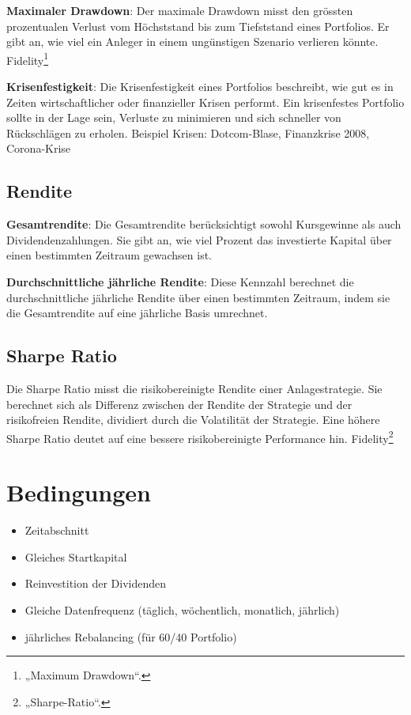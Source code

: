 \documentclass[
  ngerman,
  a4paper,
  DIV=11,
  oneside]{scrreprt}
\providecommand{\tightlist}{%
  \setlength{\itemsep}{0pt}\setlength{\parskip}{0pt}}
\begin{document}
\textbf{Maximaler Drawdown}: Der maximale Drawdown misst den grössten
prozentualen Verlust vom Höchststand bis zum Tiefststand eines
Portfolios. Er gibt an, wie viel ein Anleger in einem ungünstigen
Szenario verlieren könnte. Fidelity\footnote{{„Maximum {Drawdown}``}.}

\textbf{Krisenfestigkeit}: Die Krisenfestigkeit eines Portfolios
beschreibt, wie gut es in Zeiten wirtschaftlicher oder finanzieller
Krisen performt. Ein krisenfestes Portfolio sollte in der Lage sein,
Verluste zu minimieren und sich schneller von Rückschlägen zu erholen.
Beispiel Krisen: Dotcom-Blase, Finanzkrise 2008, Corona-Krise

\subsection{Rendite}\label{rendite}

\textbf{Gesamtrendite}: Die Gesamtrendite berücksichtigt sowohl
Kursgewinne als auch Dividendenzahlungen. Sie gibt an, wie viel Prozent
das investierte Kapital über einen bestimmten Zeitraum gewachsen ist.

\textbf{Durchschnittliche jährliche Rendite}: Diese Kennzahl berechnet
die durchschnittliche jährliche Rendite über einen bestimmten Zeitraum,
indem sie die Gesamtrendite auf eine jährliche Basis umrechnet.

\subsection{Sharpe Ratio}\label{sharpe-ratio}

Die Sharpe Ratio misst die risikobereinigte Rendite einer
Anlagestrategie. Sie berechnet sich als Differenz zwischen der Rendite
der Strategie und der risikofreien Rendite, dividiert durch die
Volatilität der Strategie. Eine höhere Sharpe Ratio deutet auf eine
bessere risikobereinigte Performance hin. Fidelity\footnote{{„Sharpe-{Ratio}``}.}

\section{Bedingungen}\label{bedingungen}

\begin{itemize}
\tightlist
\item
  Zeitabschnitt
\item
  Gleiches Startkapital
\item
  Reinvestition der Dividenden
\item
  Gleiche Datenfrequenz (täglich, wöchentlich, monatlich, jährlich)
\item
  jährliches Rebalancing (für 60/40 Portfolio)
\end{itemize}
\end{document}
